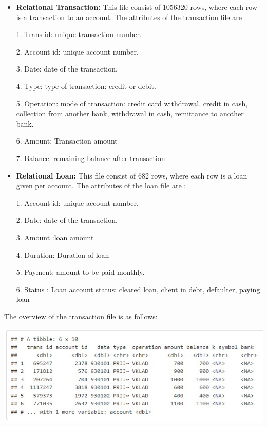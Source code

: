 \begin{itemize}
\item \textbf{Relational Transaction: }This file consist of 1056320 rows, where each row is a transaction to an account. The attributes of the transaction file are :

\item[1.] Trans id: unique transaction number.
\item[2.] Account id: unique account number.
\item[3.] Date: date of the transaction.
\item[4.] Type: type of transaction: credit or debit.
\item[5.] Operation: mode of transaction: credit card withdrawal, credit in cash, collection from another bank, withdrawal in cash, remittance to another bank.
\item[6.] Amount: Transaction amount
\item[7.] Balance: remaining balance after transaction

\item \textbf{Relational Loan: }This file consist of 682 rows, where each row is a loan given per account. The attributes of the loan file are :

\item[1.] Account id: unique account number.
\item[2.] Date: date of the transaction.
\item[3.] Amount :loan amount
\item[4.] Duration: Duration of loan 
\item[5.] Payment: amount to be paid monthly.
\item[6.] Status : Loan account status: cleared loan, client in debt, defaulter, paying loan
\end{itemize}
The overview of the transaction file is as follows:
				\begin{center}
				\includegraphics[width=\linewidth]{figures/description-transaction.jpg}	
				\label{fig: Description of Transaction File}
				\end{center}
